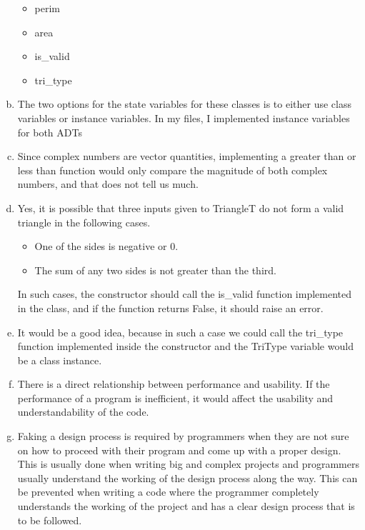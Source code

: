 \documentclass[12pt]{article}
\begin{document}
\begin{enumerate}[(a)]
\begin{itemize}
\item perim

\item area

\item is\_valid

\item tri\_type

\end{itemize}

\item The two options for the state variables for these classes is to either use class variables or instance variables. In my files, I implemented instance variables for both ADTs

\item Since complex numbers are vector quantities, implementing a greater than or less than function would only compare the magnitude of both complex numbers, and that does not tell us much.

\item Yes, it is possible that three inputs given to TriangleT do not form a valid triangle in the following cases.

\begin{itemize}

\item One of the sides is negative or 0.

\item The sum of any two sides is not greater than the third.

\end{itemize}

\noindent In such cases, the constructor should call the is\_valid function implemented in the class, and if the function returns False, it should raise an error.

\item It would be a good idea, because in such a case we could call the tri\_type function implemented inside the constructor and the TriType variable would be a class instance.

\item There is a direct relationship between performance and usability. If the performance of a program is inefficient, it would affect the usability and understandability of the code.

\item Faking a design process is required by programmers when they are not sure on how to proceed with their program and come up with a proper design. This is usually done when writing big and complex projects and programmers usually understand the working of the design process along the way. This can be prevented when writing a code where the programmer completely understands the working of the project and has a clear design process that is to be followed.


\end{enumerate}
\end{document}
